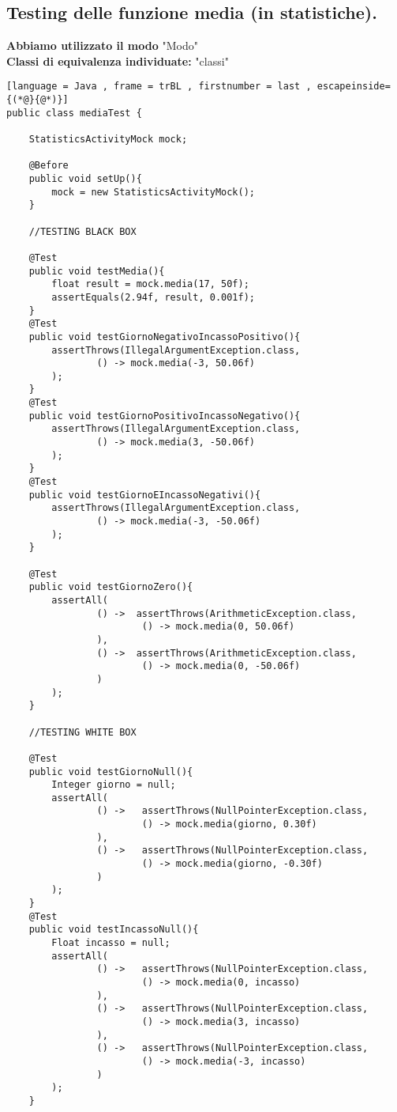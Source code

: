 




\subsection{Testing delle funzione media (in statistiche).}
\begin{flushleft}
    \textbf{Abbiamo utilizzato il modo} "Modo"\\
    \textbf{Classi di equivalenza individuate:} "classi"
\end{flushleft}
\vspace{0.2cm}
\begin{lstlisting}[language = Java , frame = trBL , firstnumber = last , escapeinside={(*@}{@*)}]
public class mediaTest {

    StatisticsActivityMock mock;

    @Before
    public void setUp(){
        mock = new StatisticsActivityMock();
    }

    //TESTING BLACK BOX

    @Test
    public void testMedia(){
        float result = mock.media(17, 50f);
        assertEquals(2.94f, result, 0.001f);
    }
    @Test
    public void testGiornoNegativoIncassoPositivo(){
        assertThrows(IllegalArgumentException.class,
                () -> mock.media(-3, 50.06f)
        );
    }
    @Test
    public void testGiornoPositivoIncassoNegativo(){
        assertThrows(IllegalArgumentException.class,
                () -> mock.media(3, -50.06f)
        );
    }
    @Test
    public void testGiornoEIncassoNegativi(){
        assertThrows(IllegalArgumentException.class,
                () -> mock.media(-3, -50.06f)
        );
    }

    @Test
    public void testGiornoZero(){
        assertAll(
                () ->  assertThrows(ArithmeticException.class,
                        () -> mock.media(0, 50.06f)
                ),
                () ->  assertThrows(ArithmeticException.class,
                        () -> mock.media(0, -50.06f)
                )
        );
    }

    //TESTING WHITE BOX

    @Test
    public void testGiornoNull(){
        Integer giorno = null;
        assertAll(
                () ->   assertThrows(NullPointerException.class,
                        () -> mock.media(giorno, 0.30f)
                ),
                () ->   assertThrows(NullPointerException.class,
                        () -> mock.media(giorno, -0.30f)
                )
        );
    }
    @Test
    public void testIncassoNull(){
        Float incasso = null;
        assertAll(
                () ->   assertThrows(NullPointerException.class,
                        () -> mock.media(0, incasso)
                ),
                () ->   assertThrows(NullPointerException.class,
                        () -> mock.media(3, incasso)
                ),
                () ->   assertThrows(NullPointerException.class,
                        () -> mock.media(-3, incasso)
                )
        );
    }


\end{lstlisting}
